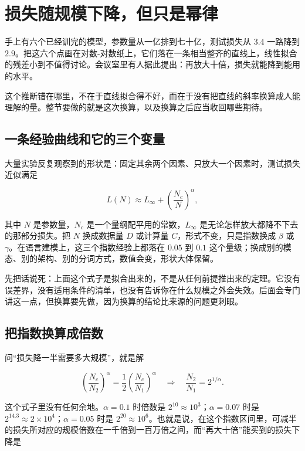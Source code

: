 \section{损失随规模下降，但只是幂律}
\label{sec:14-Deep-Learning/09-Scaling-and-Adaptation/01}

手上有六个已经训完的模型，参数量从一亿排到七十亿，测试损失从 \(3.4\) 一路降到 \(2.9\)。把这六个点画在对数-对数纸上，它们落在一条相当整齐的直线上，线性拟合的残差小到不值得讨论。会议室里有人据此提出：再放大十倍，损失就能降到能用的水平。

这个推断错在哪里，不在于直线拟合得不好，而在于没有把直线的斜率换算成人能理解的量。整节要做的就是这次换算，以及换算之后应当收回哪些期待。

\subsection{一条经验曲线和它的三个变量}

大量实验反复观察到的形状是：固定其余两个因素、只放大一个因素时，测试损失近似满足

\[
  L(N) \approx L_\infty + \left(\frac{N_c}{N}\right)^{\alpha},
\]

其中 \(N\) 是参数量，\(N_c\) 是一个量纲配平用的常数，\(L_\infty\) 是无论怎样放大都降不下去的那部分损失。把 \(N\) 换成数据量 \(D\) 或计算量 \(C\)，形式不变，只是指数换成 \(\beta\) 或 \(\gamma\)。在语言建模上，这三个指数经验上都落在 \(0.05\) 到 \(0.1\) 这个量级；换成别的模态、别的架构、别的分词方式，数值会变，形状大体保留。

先把话说死：上面这个式子是拟合出来的，不是从任何前提推出来的定理。它没有误差界，没有适用条件的清单，也没有告诉你在什么规模之外会失效。后面会专门讲这一点，但换算要先做，因为换算的结论比来源的问题更刺眼。

\subsection{把指数换算成倍数}

问``损失降一半需要多大规模''，就是解

\[
  \left(\frac{N_c}{N_2}\right)^{\alpha} = \frac{1}{2}\left(\frac{N_c}{N_1}\right)^{\alpha}
  \quad\Longrightarrow\quad
  \frac{N_2}{N_1} = 2^{1/\alpha}.
\]

这个式子里没有任何余地。\(\alpha = 0.1\) 时倍数是 \(2^{10} \approx 10^3\)；\(\alpha = 0.07\) 时是 \(2^{14.3} \approx 2\times 10^{4}\)；\(\alpha = 0.05\) 时是 \(2^{20} \approx 10^{6}\)。也就是说，在这个指数区间里，可减半的损失所对应的规模倍数在一千倍到一百万倍之间，而``再大十倍''能买到的损失下降是

